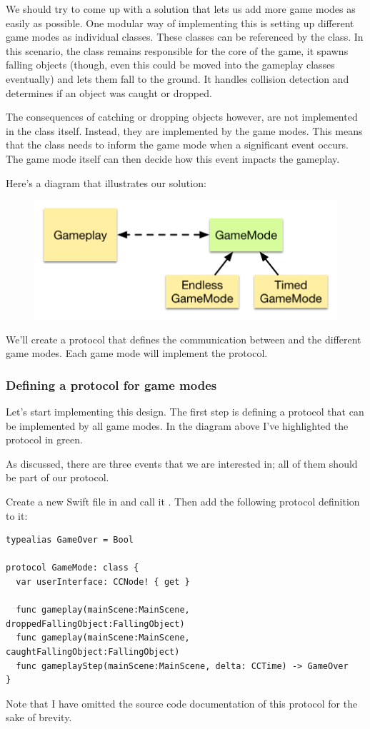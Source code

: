 We should try to come up with a solution that lets us add more game modes as
easily as possible. One modular way of implementing this is setting up different
game modes as individual classes. These classes can be referenced by the
 class. In this scenario, the  class
remains responsible for the core of the game, it spawns falling objects (though,
even this could be moved into the gameplay classes eventually) and lets them
fall to the ground. It handles collision detection and determines if an object
was caught or dropped.

The consequences of catching or dropping objects however, are not implemented in
the  class itself. Instead, they are implemented by the
game modes. This means that the  class needs to inform the
game mode when a significant event occurs. The game mode itself can then decide
how this event impacts the gameplay.

Here's a diagram that illustrates our solution:

\begin{figure}[H]
    \centering
    \includegraphics[width=0.5\linewidth]{images/Chapter7/gameplay_design.png}
\end{figure} 

We'll create a  protocol that defines the
communication between  and the different game modes. Each
game mode will implement the  protocol.

\subsubsection{Defining a protocol for game modes}
Let's start implementing this design. The first step is defining a protocol
that can be implemented by all game modes. In the diagram above I've highlighted
the protocol in green.

As discussed, there are three events that we are interested in; all of them
should be part of our protocol.
\begin{leftbar}
Create a new Swift file in \xcode{} and call it
.
Then add the following protocol definition to it:
\begin{lstlisting}
typealias GameOver = Bool

protocol GameMode: class {
  var userInterface: CCNode! { get }

  func gameplay(mainScene:MainScene, droppedFallingObject:FallingObject)
  func gameplay(mainScene:MainScene, caughtFallingObject:FallingObject)
  func gameplayStep(mainScene:MainScene, delta: CCTime) -> GameOver
}
\end{lstlisting}
\end{leftbar}
Note that I have omitted the source code documentation of this protocol for the
sake of brevity. 

